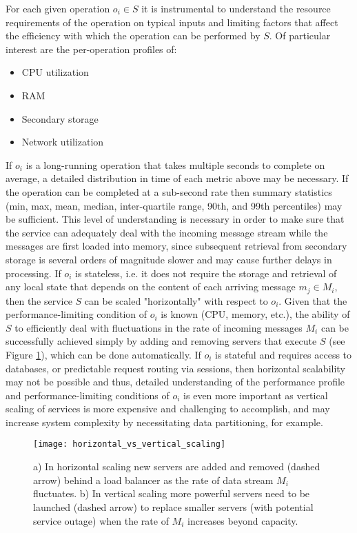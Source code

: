 For each given operation $o_i \in S$ it is instrumental to understand the resource requirements of the operation on typical inputs and limiting factors that affect the efficiency with which the operation can be performed by $S$. Of particular interest are the per-operation profiles of:

\begin{itemize}
    \item CPU utilization
    \item RAM
    \item Secondary storage
    \item Network utilization
\end{itemize}

If $o_i$ is a long-running operation that takes multiple seconds to complete on average, a detailed distribution in time of each metric above may be necessary. If the operation can be completed at a sub-second rate then summary statistics (min, max, mean, median, inter-quartile range, 90th, and 99th percentiles) may be sufficient. This level of understanding is necessary in order to make sure that the service can adequately deal with the incoming message stream while the messages are first loaded into memory, since subsequent retrieval from secondary storage is several orders of magnitude slower and may cause further delays in processing. If $o_i$ is stateless, i.e. it does not require the storage and retrieval of any local state that depends on the content of each arriving message $m_j \in M_i$, then the service $S$ can be scaled "horizontally"\autocite{vaquero2011dynamically} with respect to $o_i$. Given that the performance-limiting condition of $o_i$ is known (CPU, memory, etc.), the ability of $S$ to efficiently deal with fluctuations in the rate of incoming messages $M_i$ can be successfully achieved simply by adding and removing servers that execute $S$ (see Figure \ref{fig:horizontal_vs_vertical_scaling}), which can be done automatically\autocite{mao2011auto}. If $o_i$ is stateful and requires access to databases, or predictable request routing via sessions, then horizontal scalability may not be possible and thus, detailed understanding of the performance profile and performance-limiting conditions of $o_i$ is even more important as vertical scaling of services is more expensive and challenging to accomplish, and may increase system complexity by necessitating data partitioning, for example\autocite{vaquero2011dynamically}.

\begin{figure}[H]
\texttt{[image: horizontal\_vs\_vertical\_scaling]}
\centering
\caption {a) In horizontal scaling new servers are added and removed (dashed arrow) behind a load balancer as the rate of data stream $M_i$ fluctuates. b) In vertical scaling more powerful servers need to be launched (dashed arrow) to replace smaller servers (with potential service outage) when the rate of $M_i$ increases beyond capacity.}
\label{fig:horizontal_vs_vertical_scaling}
\end{figure}

